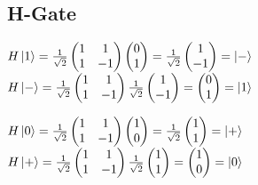 \documentclass[a4]{article}
\begin{document}
\subsection{H-Gate}
\begin{center}
$H\ket{1} = \frac{1}{\sqrt{2}}\begin{pmatrix}1 & 1\\1 & -1\end{pmatrix}\begin{pmatrix}0\\1\end{pmatrix} = \frac{1}{\sqrt{2}}\begin{pmatrix}1\\-1\end{pmatrix} = \ket{-}$\\\vspace{5mm}
$H\ket{-} = \frac{1}{\sqrt{2}}\begin{pmatrix}1 & 1\\1 & -1\end{pmatrix}\frac{1}{\sqrt{2}}\begin{pmatrix}1\\-1\end{pmatrix} = \begin{pmatrix}0\\1\end{pmatrix} = \ket{1}$
\end{center}
\vspace{10mm}
\begin{center}
$H\ket{0} = \frac{1}{\sqrt{2}}\begin{pmatrix}1 & 1\\1 & -1\end{pmatrix}\begin{pmatrix}1\\0\end{pmatrix} = \frac{1}{\sqrt{2}}\begin{pmatrix}1\\1\end{pmatrix} = \ket{+}$\\\vspace{5mm}
$H\ket{+} = \frac{1}{\sqrt{2}}\begin{pmatrix}1 & 1\\1 & -1\end{pmatrix}\frac{1}{\sqrt{2}}\begin{pmatrix}1\\1\end{pmatrix} = \begin{pmatrix}1\\0\end{pmatrix} = \ket{0}$
\end{center}
\end{document}
